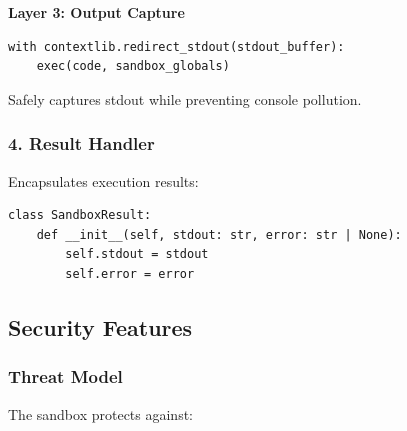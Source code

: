 \documentclass[12pt,a4paper]{article}
\begin{document}
\textbf{Layer 3: Output Capture}
\begin{verbatim}
with contextlib.redirect_stdout(stdout_buffer):
    exec(code, sandbox_globals)
\end{verbatim}
Safely captures stdout while preventing console pollution.

\subsubsection{4. Result Handler}
Encapsulates execution results:

\begin{lstlisting}[caption=Result Object]
class SandboxResult:
    def __init__(self, stdout: str, error: str | None):
        self.stdout = stdout
        self.error = error
\end{lstlisting}

\subsection{Security Features}

\subsubsection{Threat Model}
The sandbox protects against:
\end{document}
